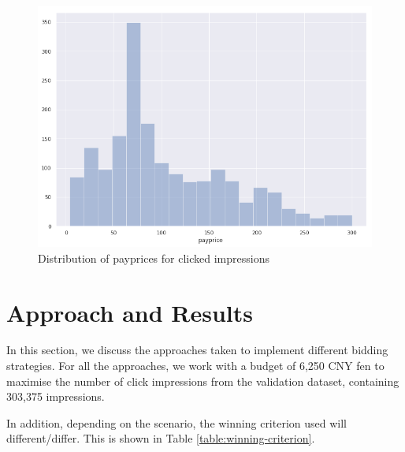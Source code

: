 \documentclass{sig-alternate-05-2015}
\begin{document}
\begin{figure}[h!]
	\centering
	\includegraphics[width=\linewidth]{images/payprice_click_dist.png}
	\caption{Distribution of payprices for clicked impressions}
	\label{fig:click-payprice-dist}
\end{figure}


\section{Approach and Results}
In this section, we discuss the approaches taken to implement different bidding strategies. For all the approaches, we work with a budget of 6,250 CNY fen to maximise the number of click impressions from the validation dataset, containing 303,375 impressions.

In addition, depending on the scenario, the winning criterion used will different/differ. This is shown in Table \ref{table:winning-criterion}. 

\begin{table}[h!]
  \centering
	\caption{Overview of Winning Criterion}
	\label{table:winning-criterion}
\end{table}
\end{document}

